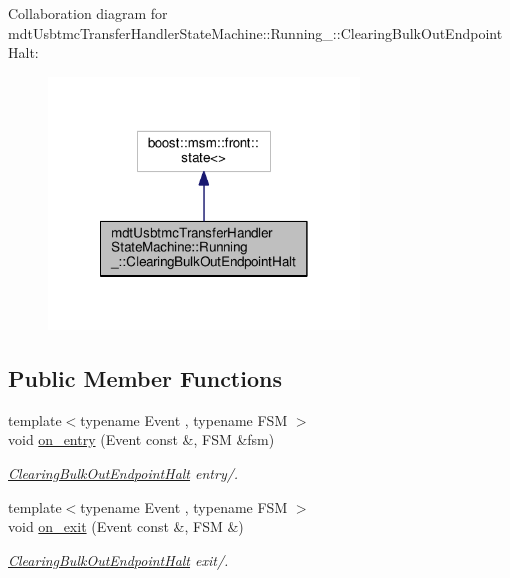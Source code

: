 Collaboration diagram for mdt\-Usbtmc\-Transfer\-Handler\-State\-Machine\-:\-:Running\-\_\-\-:\-:Clearing\-Bulk\-Out\-Endpoint\-Halt\-:
\nopagebreak
\begin{figure}[H]
\begin{center}
\leavevmode
\includegraphics[width=234pt]{structmdt_usbtmc_transfer_handler_state_machine_1_1_running___1_1_clearing_bulk_out_endpoint_halt__coll__graph}
\end{center}
\end{figure}
\subsection*{Public Member Functions}
\begin{DoxyCompactItemize}
\item 
{\footnotesize template$<$typename Event , typename F\-S\-M $>$ }\\void \hyperlink{structmdt_usbtmc_transfer_handler_state_machine_1_1_running___1_1_clearing_bulk_out_endpoint_halt_a7ad28cb69a8921cf49143333cb28f2c2}{on\-\_\-entry} (Event const \&, F\-S\-M \&fsm)
\begin{DoxyCompactList}\small\item\em \hyperlink{structmdt_usbtmc_transfer_handler_state_machine_1_1_running___1_1_clearing_bulk_out_endpoint_halt}{Clearing\-Bulk\-Out\-Endpoint\-Halt} entry/. \end{DoxyCompactList}\item 
{\footnotesize template$<$typename Event , typename F\-S\-M $>$ }\\void \hyperlink{structmdt_usbtmc_transfer_handler_state_machine_1_1_running___1_1_clearing_bulk_out_endpoint_halt_a4a65ab22b5ca1535a3ae77bbaed624e4}{on\-\_\-exit} (Event const \&, F\-S\-M \&)
\begin{DoxyCompactList}\small\item\em \hyperlink{structmdt_usbtmc_transfer_handler_state_machine_1_1_running___1_1_clearing_bulk_out_endpoint_halt}{Clearing\-Bulk\-Out\-Endpoint\-Halt} exit/. \end{DoxyCompactList}\end{DoxyCompactItemize}


